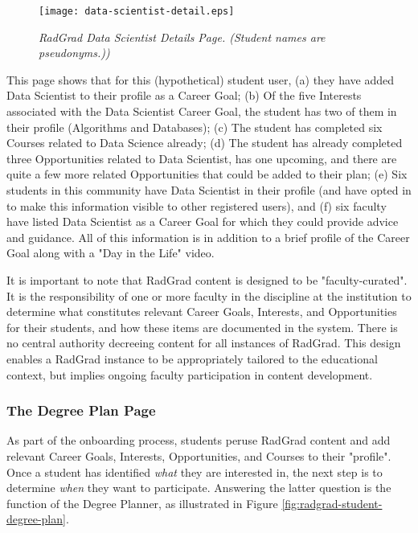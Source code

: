 \documentclass[acmsmall]{acmart}
\begin{document}
\begin{figure}[ht]
\centering
\texttt{[image: data-scientist-detail.eps]}
\caption{\em RadGrad Data Scientist Details Page. (Student names are pseudonyms.))}
\label{fig:radgrad-data-scientist-detail}
\end{figure}

This page shows that for this (hypothetical) student user, (a) they have added Data Scientist to their profile as a Career Goal; (b) Of the five Interests associated with the Data Scientist Career Goal, the student has two of them in their profile (Algorithms and Databases); (c) The student has completed six Courses related to Data Science already; (d) The student has already completed three Opportunities related to Data Scientist, has one upcoming, and there are quite a few more related Opportunities that could be added to their plan; (e) Six students in this community have Data Scientist in their profile (and have opted in to make this information visible to other registered users), and (f) six faculty have listed Data Scientist as a Career Goal for which they could provide advice and guidance.  All of this information is in addition to a brief profile of the Career Goal along with a "Day in the Life" video.

It is important to note that RadGrad content is designed to be "faculty-curated".  It is the responsibility of one or more faculty in the discipline at the institution to determine what constitutes relevant Career Goals, Interests, and Opportunities for their students, and how these items are documented in the system. There is no central authority decreeing content for all instances of RadGrad. This design enables a RadGrad instance to be appropriately tailored to the educational context, but implies ongoing faculty participation in content development.

\subsubsection{The Degree Plan Page}

As part of the onboarding process, students peruse RadGrad content and add relevant Career Goals, Interests, Opportunities, and Courses to their "profile".  Once a student has identified {\em what} they are interested in, the next step is to determine {\em when} they want to participate. Answering the latter question is the function of the Degree Planner, as illustrated in  Figure \ref{fig:radgrad-student-degree-plan}.
\end{document}

